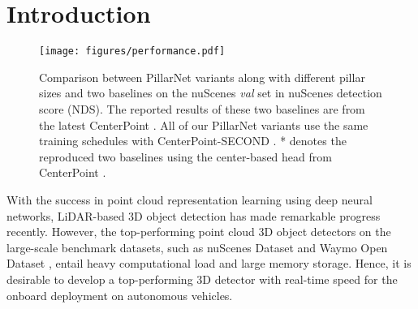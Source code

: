 \documentclass[runningheads]{llncs}
\begin{document}
\section{Introduction}

\begin{figure}[t]
\centering
\texttt{[image: figures/performance.pdf]}
\caption{Comparison between PillarNet variants along with different pillar sizes and two baselines on the nuScenes \textit{val} set in nuScenes detection score (NDS).
The reported results of these two baselines are from the latest CenterPoint \cite{yin2021center}. All of our PillarNet variants use the same training schedules with CenterPoint-SECOND \cite{yin2021center}.
* denotes the reproduced two baselines using the center-based head from CenterPoint \cite{yin2021center}.
}
\label{fig:performance}
\end{figure}

With the success in point cloud representation learning using deep neural networks, LiDAR-based 3D object detection has made remarkable progress recently.
However, the top-performing point cloud 3D object detectors on the large-scale benchmark datasets, such as nuScenes Dataset \cite{caesar2020nuscenes} and Waymo Open Dataset \cite{sun2020scalability}, entail heavy computational load and large memory storage. Hence, it is desirable to develop a top-performing 3D detector with real-time speed for the onboard deployment on autonomous vehicles. 
\end{document}
